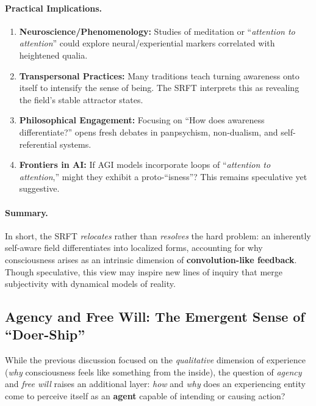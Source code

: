 \documentclass[12pt,a4paper]{article}
\begin{document}
\paragraph{Practical Implications.}
\begin{enumerate}
    \item \textbf{Neuroscience/Phenomenology:} 
    Studies of meditation or “\emph{attention to attention}” could explore 
    neural/experiential markers correlated with heightened qualia.

    \item \textbf{Transpersonal Practices:} 
    Many traditions teach turning awareness onto itself to intensify the sense of being. 
    The SRFT interprets this as revealing the field’s stable attractor states.

    \item \textbf{Philosophical Engagement:} 
    Focusing on “How does awareness differentiate?” opens fresh debates 
    in panpsychism, non-dualism, and self-referential systems.

    \item \textbf{Frontiers in AI:}
    If AGI models incorporate loops of “\emph{attention to attention},” 
    might they exhibit a proto-“isness”? This remains speculative yet suggestive.
\end{enumerate}

\paragraph{Summary.}
In short, the SRFT \emph{relocates} rather than \emph{resolves} the hard problem: 
an inherently self-aware field differentiates into localized forms, accounting for 
why consciousness arises as an intrinsic dimension of \textbf{convolution-like feedback}. 
Though speculative, this view may inspire new lines of inquiry that merge subjectivity 
with dynamical models of reality.


\subsection{Agency and Free Will: The Emergent Sense of ``Doer-Ship''}
\label{sec:agency-freewill}

While the previous discussion focused on the \emph{qualitative} dimension of experience
(\emph{why} consciousness feels like something from the inside), the question of
\emph{agency} and \emph{free will} raises an additional layer: \emph{how} and \emph{why}
does an experiencing entity come to perceive itself as an \textbf{agent} capable of
intending or causing action? 
\end{document}
